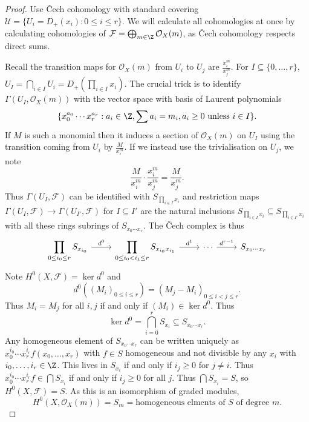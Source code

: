 \documentclass[a4paper]{article}
\newcommand{\sh}[1]{\mathcal{#1}} %
\begin{document}
\begin{proof}
  Use Čech cohomology with standard covering \(\mathcal U = \{U_i = D_+(x_i): 0 \leq i \leq r\}\). We will calculate all cohomologies at once by calculating cohomologies of \(\sh F = \bigoplus_{m \in \Z} \sh O_X(m)\), as Čech cohomology respects direct sums.

  Recall the transition maps for \(\sh O_X(m)\) from \(U_i\) to \(U_j\) are \(\frac{x_i^m}{x_j^m}\). For \(I \subseteq \{0, \dots, r\}\), \(U_I = \bigcap_{i \in I} U_i = D_+(\prod_{i \in I}x_i)\). The crucial trick is to identify \(\Gamma(U_I, \sh O_X(m))\) with the vector space with basis of Laurent polynomials
  \[
    \{x_0^{a_0} \cdots x_r^{a_r}: a_i \in \Z, \sum a_i = m_i, a_i \geq 0 \text{ unless } i \in I\}.
  \]
  If \(M\) is such a monomial then it induces a section of \(\sh O_X(m)\) on \(U_I\) using the transition coming from \(U_i\) by \(\frac{M}{x_i^m}\). If we instead use the trivialisation on \(U_j\), we note
  \[
    \frac{M}{x_i^m} \cdot \frac{x_i^m}{x_j^m} = \frac{M}{x_j^m}.
  \]
  Thus \(\Gamma(U_I, \sh F)\) can be identified with \(S_{\prod_{i \in I}x_i}\) and restriction maps \(\Gamma(U_I, \sh F) \to \Gamma(U_{I'}, \sh F)\) for \(I \subseteq I'\) are the natural inclusions \(S_{\prod_{i \in I} x_i} \subseteq S_{\prod_{i \in I'} x_i}\) with all these rings subrings of \(S_{x_0 \cdots x_r}\). The Čech complex is thus
  \[
    \begin{tikzcd}
      \displaystyle \prod_{0 \leq i_0 \leq r} S_{x_{i_0}} \ar[r, "d^0"] & \displaystyle \prod_{0 \leq i_0 < i_1 \leq r} S_{x_{i_0} x_{i_1}} \ar[r, "d^1"] & \cdots \ar[r, "d^{r - 1}"] & S_{x_0 \cdots x_r}
    \end{tikzcd}
  \]
  Note \(H^0(X, \sh F) = \ker d^0\) and
  \[
    d^0((M_i)_{0 \leq i \leq r}) = (M_j - M_i)_{0 \leq i < j \leq r}.
  \]
  Thus \(M_i = M_j\) for all \(i, j\) if and only if \((M_i) \in \ker d^0\). Thus
  \[
    \ker d^0 = \bigcap_{i = 0}^r S_{x_i} \subseteq S_{x_0 \cdots x_r}.
  \]
  Any homogeneous element of \(S_{x_0 \cdots x_r}\) can be written uniquely as \(x_0^{i_0} \cdots x_r^{i_r} f(x_0, \dots, x_r)\) with \(f \in S\) homogeneous and not divisible by any \(x_i\) with \(i_0, \dots, i_r \in \Z\). This lives in \(S_{x_i}\) if and only if \(i_j \geq 0\) for \(j \neq i\). Thus \(x_0^{i_0} \cdots x_r^{i_r} f \in \bigcap S_{x_i}\) if and only if \(i_j \geq 0\) for all \(j\). Thus \(\bigcap S_{x_i} = S\), so \(H^0(X, \sh F) = S\). As this is an isomorphism of graded modules,
  \[
    H^0(X, \sh O_X(m)) = S_m = \text{homogeneous elments of \(S\) of degree \(m\)}.
  \]


\end{proof}
\end{document}
